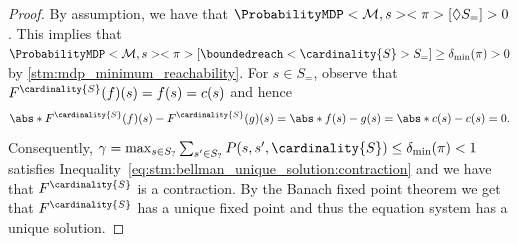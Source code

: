\documentclass{theoretics}
\newcommand{\MDP}{\mathcal{M}}
\newcommand{\States}{S}
\newcommand{\strategy}{\pi}
\newcommand{\reach}{\Diamond}
\begin{document}
\begin{proof}
	By assumption, we have that $\ProbabilityMDP<\MDP, s><\strategy>[\reach \States_=] > 0$.
	This implies that $\ProbabilityMDP<\MDP, s><\strategy>[\boundedreach<\cardinality{\States}> \States_=] \geq \delta_{\min}(\strategy) > 0$ by \cref{stm:mdp_minimum_reachability}.
	For $s \in S_=$, observe that $F^{\cardinality{S}}(f)(s) = f(s) = c(s)$ and hence
	\begin{equation*}
		\abs*{F^{\cardinality{\States}}(f)(s) - F^{\cardinality{\States}}(g)(s)} = \abs*{f(s) - g(s)} = \abs*{c(s) - c(s)} = 0.
	\end{equation*}
	Consequently, $\gamma = \max_{s \in \States_?} \sum_{s' \in \States_?} P(s, s', \cardinality{S}) \leq \delta_{\min}(\strategy) < 1$ satisfies Inequality~\eqref{eq:stm:bellman_unique_solution:contraction} and we have that $F^{\cardinality{\States}}$ is a contraction.
	By the Banach fixed point theorem we get that $F^{\cardinality{\States}}$ has a unique fixed point and thus the equation system has a unique solution. 
\end{proof}
\end{document}
